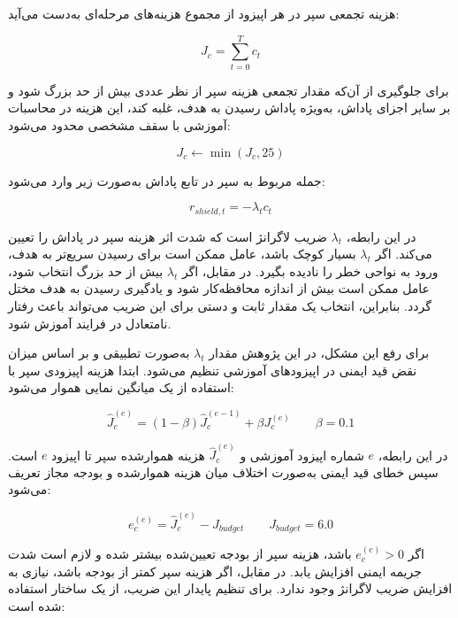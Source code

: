 هزینه تجمعی سپر در هر اپیزود از مجموع هزینه‌های مرحله‌ای به‌دست می‌آید:

\begin{equation}
	J_c =
	\sum_{t=0}^{T} c_t
	\label{eq:shield_episode_cost_final}
\end{equation}

برای جلوگیری از آن‌که مقدار تجمعی هزینه سپر از نظر عددی بیش از حد بزرگ شود و بر سایر اجزای پاداش، به‌ویژه پاداش رسیدن به هدف، غلبه کند، این هزینه در محاسبات آموزشی با سقف مشخصی محدود می‌شود:

\begin{equation}
	J_c \leftarrow \min(J_c,25)
	\label{eq:shield_cost_cap_final}
\end{equation}

جمله مربوط به سپر در تابع پاداش به‌صورت زیر وارد می‌شود:

\begin{equation}
	r_{shield,t}
	=
	-\lambda_t c_t
	\label{eq:shield_reward_term_final}
\end{equation}

در این رابطه، \(\lambda_t\) ضریب لاگرانژ است که شدت اثر هزینه سپر در پاداش را تعیین می‌کند. اگر \(\lambda_t\) بسیار کوچک باشد، عامل ممکن است برای رسیدن سریع‌تر به هدف، ورود به نواحی خطر را نادیده بگیرد. در مقابل، اگر \(\lambda_t\) بیش از حد بزرگ انتخاب شود، عامل ممکن است بیش از اندازه محافظه‌کار شود و یادگیری رسیدن به هدف مختل گردد. بنابراین، انتخاب یک مقدار ثابت و دستی برای این ضریب می‌تواند باعث رفتار نامتعادل در فرایند آموزش شود.

برای رفع این مشکل، در این پژوهش مقدار \(\lambda_t\) به‌صورت تطبیقی و بر اساس میزان نقض قید ایمنی در اپیزودهای آموزشی تنظیم می‌شود. ابتدا هزینه اپیزودی سپر با استفاده از یک میانگین نمایی هموار می‌شود:

\begin{equation}
	\hat{J}^{(e)}_c =
	(1-\beta)\hat{J}^{(e-1)}_c
	+
	\beta J^{(e)}_c
	\qquad
	\beta=0.1
	\label{eq:shield_cost_ema_final}
\end{equation}

در این رابطه، \(e\) شماره اپیزود آموزشی و \(\hat{J}^{(e)}_c\) هزینه هموارشده سپر تا اپیزود \(e\) است. سپس خطای قید ایمنی به‌صورت اختلاف میان هزینه هموارشده و بودجه مجاز تعریف می‌شود:

\begin{equation}
	e_c^{(e)} =
	\hat{J}^{(e)}_c
	-
	J_{budget}
	\qquad
	J_{budget}=6.0
	\label{eq:shield_constraint_error_final}
\end{equation}

اگر \(e_c^{(e)}>0\) باشد، هزینه سپر از بودجه تعیین‌شده بیشتر شده و لازم است شدت جریمه ایمنی افزایش یابد. در مقابل، اگر هزینه سپر کمتر از بودجه باشد، نیازی به افزایش ضریب لاگرانژ وجود ندارد. برای تنظیم پایدار این ضریب، از یک ساختار  استفاده شده است:

